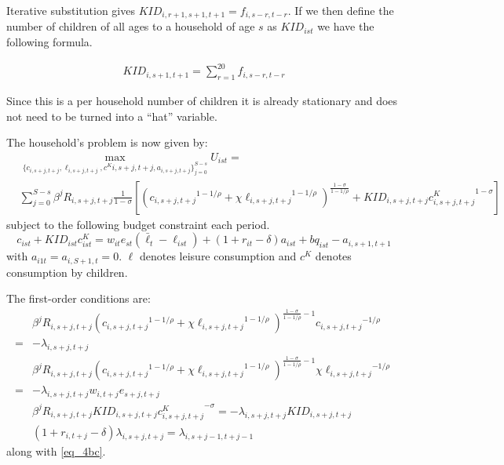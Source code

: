 \documentclass[letterpaper,12pt]{article}
\theoremstyle{definition}
\numberwithin{equation}{section}
\begin{document}
\begin{spacing}{1.5}
	Iterative substitution gives $KID_{i,r+1,s+1,t+1} = f_{i,s-r,t-r}$.  If we then define the number of children of all ages to a household of age $s$ as $KID_{ist}$ we have the following formula.

	\begin{align}
		KID_{i,s+1,t+1} = \sum_{r=1}^{20} f_{i,s-r,t-r}
	\end{align}

	Since this is a per household number of children it is already stationary and does not need to be turned into a ``hat'' variable.

	The household's problem is now given by:
	\begin{equation}
		\begin{split}
		& \max_{\{c_{i,s+j,t+j},\ell_{i,s+j,t+j},c^K{i,s+j,t+j},a_{i,s+j,t+j}\}_{j=0}^{S-s}} U_{ist} = \\
		& \sum_{j=0}^{S-s} \beta^j R_{i,s+j,t+j} \frac{1}{1-\sigma} \left[ \left( {c_{i,s+j,t+j}}^{1-1/\rho} + \chi {\ell_{i,s+j,t+j}}^{1-1/\rho}\right)^{\tfrac{{1-\sigma}}{1-1/\rho}} + KID_{i,s+j,t+j}{c^K_{i,s+j,t+j}}^{1-\sigma}\right] \nonumber
		\end{split}
	\end{equation}
	subject to the following budget constraint each period.
	\begin{equation} \label{eq_4bc}
		c_{ist} + KID_{ist}c^K_{ist} = w_{it} e_{st} (\bar \ell_t -\ell_{ist}) + (1+r_{it}-\delta)a_{ist} + bq_{ist} - a_{i,s+1,t+1}
	\end{equation}
	with $a_{i1t} = a_{i,S+1,t} = 0$.  $\ell$ denotes leisure consumption and $c^K$ denotes consumption by children.

	The first-order conditions are:
	\begin{align}
		& \beta^j R_{i,s+j,t+j} \left( {c_{i,s+j,t+j}}^{1-1/\rho} + \chi {\ell_{i,s+j,t+j}}^{1-1/\rho}\right)^{\tfrac{{1-\sigma}}{1-1/\rho}-1} {c_{i,s+j,t+j}}^{-1/\rho}  \nonumber \\ = &  - \lambda_{i,s+j,t+j}  \label{eq_4foc1} \\
		& \beta^j R_{i,s+j,t+j} \left( {c_{i,s+j,t+j}}^{1-1/\rho} + \chi {\ell_{i,s+j,t+j}}^{1-1/\rho}\right)^{\tfrac{{1-\sigma}}{1-1/\rho}-1} \chi {\ell_{i,s+j,t+j}}^{-1/\rho} \nonumber \\ = & - \lambda_{i,s+j,t+j} w_{i,t+j} e_{s+j,t+j} \label{eq_4foc2} \\
		& \beta^j R_{i,s+j,t+j} KID_{i,s+j,t+j}{c^K_{i,s+j,t+j}}^{-\sigma} = - \lambda_{i,s+j,t+j} KID_{i,s+j,t+j} \label{eq_4foc3} \\
               & (1+r_{i,t+j}-\delta) \lambda_{i,s+j,t+j} = \lambda_{i,s+j-1,t+j-1} \label{eq_4foc4}
	\end{align}	
	along with \eqref{eq_4bc}.


\end{spacing}
\end{document}
